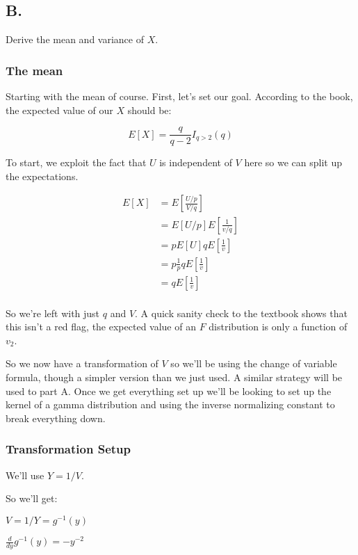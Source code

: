 \subsection*{B.}

Derive the mean and variance of $X$.

\subsubsection*{The mean}

Starting with the mean of course. First, let's set our goal. According to the book, the expected value of our $X$ should be:

$$E[X] = \frac{q}{q-2} I_{q > 2}(q)$$

To start, we exploit the fact that $U$ is independent of $V$ here so we can split up the expectations.

\vspace{-0.4cm}
\begin{align*}
	E[X] &= E\left[ \frac{U/p}{V/q} \right] \\
	&= E[U/p] E\left[ \frac{1}{v/q} \right] \\
	&= pE[U] qE\left[ \frac{1}{v} \right] \\
	&= p\frac{1}{p}qE\left[ \frac{1}{v} \right] \\
	&= qE\left[ \frac{1}{v} \right] \\
\end{align*}

So we're left with just $q$ and $V$. A quick sanity check to the textbook shows that this isn't a red flag, the expected value of an $F$ distribution is only a function of $v_2$. 

So we now have a transformation of $V$ so we'll be using the change of variable formula, though a simpler version than we just used. A similar strategy will be used to part A. Once we get everything set up we'll be looking to set up the kernel of a gamma distribution and using the inverse normalizing constant to break everything down. 

\subsubsection*{Transformation Setup}

We'll use $Y = 1/V$. 

So we'll get:

$V=1/Y=g^{-1}(y)$

$\frac{d}{dy}g^{-1}(y) = -y^{-2}$


